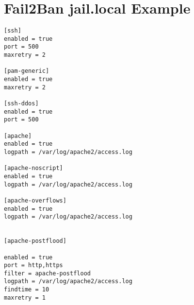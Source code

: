 \chapter{Fail2Ban jail.local Example}
\label{app:fail2banLocal}

\begin{lstlisting}
[ssh]
enabled = true
port = 500
maxretry = 2

[pam-generic]
enabled = true
maxretry = 2

[ssh-ddos]
enabled = true
port = 500

[apache]
enabled = true
logpath = /var/log/apache2/access.log

[apache-noscript]
enabled = true
logpath = /var/log/apache2/access.log

[apache-overflows]
enabled = true
logpath = /var/log/apache2/access.log


[apache-postflood]

enabled = true
port = http,https
filter = apache-postflood
logpath = /var/log/apache2/access.log
findtime = 10
maxretry = 1

\end{lstlisting}
